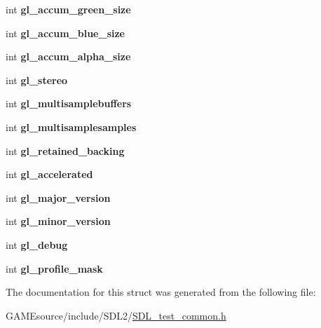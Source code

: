 \begin{DoxyCompactItemize}
\mbox{\label{struct_s_d_l_test___common_state_a4c20729a710f51ed67bdd1910da1a16b}} 
int {\bfseries gl\+\_\+accum\+\_\+green\+\_\+size}
\item 
\mbox{\label{struct_s_d_l_test___common_state_a3d23ac90e722af5098e7869a7302c119}} 
int {\bfseries gl\+\_\+accum\+\_\+blue\+\_\+size}
\item 
\mbox{\label{struct_s_d_l_test___common_state_ab6dddf75a40c53343199fe724a2af32b}} 
int {\bfseries gl\+\_\+accum\+\_\+alpha\+\_\+size}
\item 
\mbox{\label{struct_s_d_l_test___common_state_a39177b165c6a9c2164937c82402e2d4f}} 
int {\bfseries gl\+\_\+stereo}
\item 
\mbox{\label{struct_s_d_l_test___common_state_a083f7381809b23f0ac3a9a8de562f70c}} 
int {\bfseries gl\+\_\+multisamplebuffers}
\item 
\mbox{\label{struct_s_d_l_test___common_state_a96718b47862d4962e4a7ae9a62ce4a30}} 
int {\bfseries gl\+\_\+multisamplesamples}
\item 
\mbox{\label{struct_s_d_l_test___common_state_a5fa59e7aa6210fcde02940536eea9c12}} 
int {\bfseries gl\+\_\+retained\+\_\+backing}
\item 
\mbox{\label{struct_s_d_l_test___common_state_a2dca523be403a9ff6fe2dd7b1808baba}} 
int {\bfseries gl\+\_\+accelerated}
\item 
\mbox{\label{struct_s_d_l_test___common_state_a766e471516e0a39d0bb8c14ea2042bdf}} 
int {\bfseries gl\+\_\+major\+\_\+version}
\item 
\mbox{\label{struct_s_d_l_test___common_state_a5a50c65004454c791da21a3473388608}} 
int {\bfseries gl\+\_\+minor\+\_\+version}
\item 
\mbox{\label{struct_s_d_l_test___common_state_a2710657ef2a0c8aabebc5fceb01c71b5}} 
int {\bfseries gl\+\_\+debug}
\item 
\mbox{\label{struct_s_d_l_test___common_state_aa923ff5f227c35523a4e491863a7d907}} 
int {\bfseries gl\+\_\+profile\+\_\+mask}
\end{DoxyCompactItemize}


The documentation for this struct was generated from the following file\+:\begin{DoxyCompactItemize}
\item 
G\+A\+M\+Esource/include/\+S\+D\+L2/\mbox{\hyperlink{_s_d_l__test__common_8h}{S\+D\+L\+\_\+test\+\_\+common.\+h}}\end{DoxyCompactItemize}
